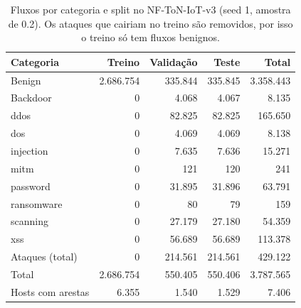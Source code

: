 \begin{table}[ht]
\centering
\caption{Fluxos por categoria e split no NF-ToN-IoT-v3 (seed 1, amostra de 0.2). Os ataques que cairiam no treino são removidos, por isso o treino só tem fluxos benignos.}
\label{tab:split-nf-ton-iot-v3}
\begin{tabular}{lrrrr}
\toprule
Categoria & Treino & Validação & Teste & Total \\
\midrule
Benign & 2.686.754 & 335.844 & 335.845 & 3.358.443 \\
Backdoor & 0 & 4.068 & 4.067 & 8.135 \\
ddos & 0 & 82.825 & 82.825 & 165.650 \\
dos & 0 & 4.069 & 4.069 & 8.138 \\
injection & 0 & 7.635 & 7.636 & 15.271 \\
mitm & 0 & 121 & 120 & 241 \\
password & 0 & 31.895 & 31.896 & 63.791 \\
ransomware & 0 & 80 & 79 & 159 \\
scanning & 0 & 27.179 & 27.180 & 54.359 \\
xss & 0 & 56.689 & 56.689 & 113.378 \\
Ataques (total) & 0 & 214.561 & 214.561 & 429.122 \\
Total & 2.686.754 & 550.405 & 550.406 & 3.787.565 \\
Hosts com arestas & 6.355 & 1.540 & 1.529 & 7.406 \\
\bottomrule
\end{tabular}
\end{table}
